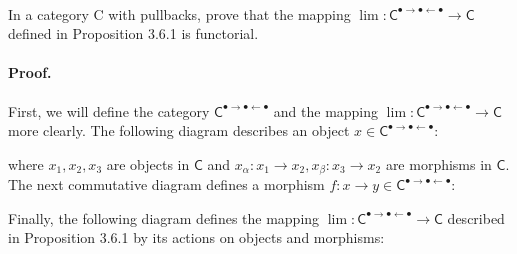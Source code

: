 \documentclass[main.tex]{subfiles}
\begin{document}
	
	\paragraph{} 
	
	\begin{exercise}
	In a category \textsf{C} with pullbacks, prove that the mapping $ \lim: \mathsf{C}^{\bullet\rightarrow\bullet\leftarrow\bullet} \to \mathsf{C} $ defined in Proposition 3.6.1 is functorial. 
\end{exercise}
	
	\paragraph{Proof.} 
	
	First, we will define the category $ \mathsf{C} ^{\bullet\rightarrow\bullet\leftarrow\bullet} $ and the mapping $ \lim: \mathsf{C}^{\bullet\rightarrow\bullet\leftarrow\bullet} \to \mathsf{C} $ more clearly. The following diagram describes an object $ x \in \mathsf{C}^{\bullet\rightarrow\bullet\leftarrow\bullet}: $
	
	\begin{center}\end{center}

	\noindent where $ x_1, x_2, x_3 $ are objects in $ \mathsf{C} $ and $ x_\alpha: x_1 \to x_2, x_\beta: x_3 \to x_2 $ are morphisms in $ \mathsf{C} $. The next commutative diagram defines a morphism $ f: x \to y \in \mathsf{C}^{\bullet\rightarrow\bullet\leftarrow\bullet}: $
	
	\begin{center}\end{center}

	\noindent Finally, the following diagram defines the mapping $ \lim: \mathsf{C}^{\bullet\rightarrow\bullet\leftarrow\bullet} \to \mathsf{C} $ described in Proposition 3.6.1 by its actions on objects and morphisms:
	 
\end{document}
